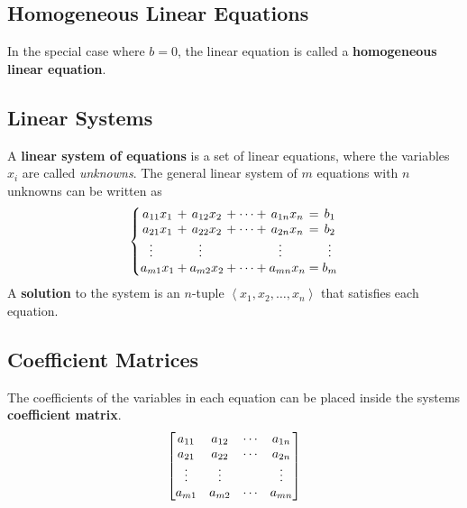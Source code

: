 \documentclass{article}
\begin{document}
	\subsection{Homogeneous Linear Equations}
	\begin{definition}
		In the special case where $b=0$, the linear equation is called a \textbf{homogeneous linear equation}.
	\end{definition}
	\subsection{Linear Systems}
	\begin{definition}
		A \textbf{linear system of equations} is a set of linear equations, where the variables $x_i$ are called \textit{unknowns}. The general linear system of $m$ equations with $n$ unknowns can be written as
		\begin{equation*}
			\left\{
			\setlength\arraycolsep{0pt}
			\begin{array}{ c >{{}}c<{{}} c >{{}}c<{{}} c >{{}}c<{{}} c >{{}}c<{{}} c }
			a_{11}x_1                         &+& a_{12}x_2                         &+& \cdots &+& a_{1n}x_n                         &=& b_1 \\
			a_{21}x_1                         &+& a_{22}x_2                         &+& \cdots &+& a_{2n}x_n                         &=& b_2 \\
			\vdotswithin{a_{31}}\phantom{x_1} & & \vdotswithin{a_{32}}\phantom{x_2} & &        & & \vdotswithin{a_{3n}}\phantom{x_n} & & \vdots \\ 
			a_{m1}x_1                         &+& a_{m2}x_2                         &+& \cdots &+& a_{mn}x_n                         &=& b_m
			\end{array}
			\right.
		\end{equation*}
		A \textbf{solution} to the system is an $n$-tuple $\left\langle x_1,x_2,\dots,x_n\right\rangle$ that satisfies each equation.
	\end{definition}
	\subsection{Coefficient Matrices}
	\begin{definition}
		The coefficients of the variables in each equation can be placed inside the systems \textbf{coefficient matrix}.
		\begin{equation*}
			\mqty[
				a_{11} & a_{12} & \cdots & a_{1n} \\
				a_{21} & a_{22} & \cdots & a_{2n} \\
				\vdots & \vdots &        & \vdots \\
				a_{m1} & a_{m2} & \cdots & a_{mn}
			]
		\end{equation*}
	\end{definition}
\end{document}
